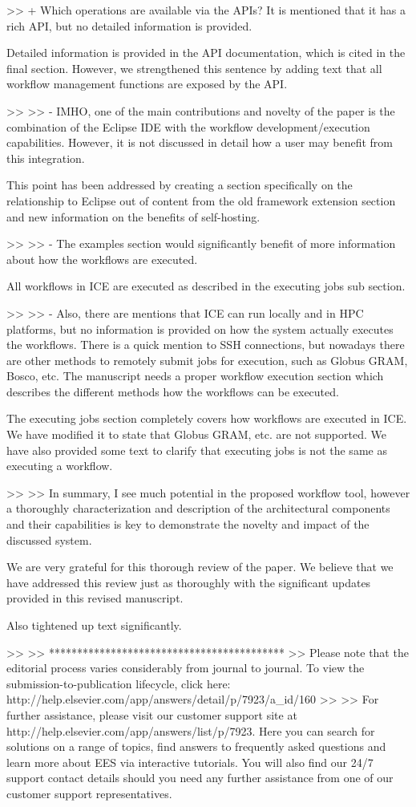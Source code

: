 >> + Which operations are available via the APIs? It is mentioned that it has a rich API, but no detailed information is provided.

Detailed information is provided in the API documentation, which is cited in the final section. However, we strengthened this sentence by adding text that all workflow management functions are exposed by the API.

>> 
>> - IMHO, one of the main contributions and novelty of the paper is the combination of the Eclipse IDE with the workflow development/execution capabilities. However, it is not discussed in detail how a user may benefit from this integration.

This point has been addressed by creating a section specifically on the relationship to Eclipse out of content from the old framework extension section and new information on the benefits of self-hosting.

>> 
>> - The examples section would significantly benefit of more information about how the workflows are executed.

All workflows in ICE are executed as described in the executing jobs sub section.

>> 
>> - Also, there are mentions that ICE can run locally and in HPC platforms, but no information is provided on how the system actually executes the workflows. There is a quick mention to SSH connections, but nowadays there are other methods to remotely submit jobs for execution, such as Globus GRAM, Bosco, etc. The manuscript needs a proper workflow execution section which describes the different methods how the workflows can be executed.

The executing jobs section completely covers how workflows are executed in ICE. We have modified it to state that Globus GRAM, etc. are not supported. We have also provided some text to clarify that executing jobs is not the same as executing a workflow.

>> 
>> In summary, I see much potential in the proposed workflow tool, however a thoroughly characterization and description of the architectural components and their capabilities is key to demonstrate the novelty and impact of the discussed system.

We are very grateful for this thorough review of the paper. We believe that we have addressed this review just as thoroughly with the significant updates provided in this revised manuscript.

Also tightened up text significantly.

>> 
>> ******************************************
>> Please note that the editorial process varies considerably from journal to journal. To view the submission-to-publication lifecycle, click here: http://help.elsevier.com/app/answers/detail/p/7923/a_id/160
>> 
>> For further assistance, please visit our customer support site at http://help.elsevier.com/app/answers/list/p/7923. Here you can search for solutions on a range of topics, find answers to frequently asked questions and learn more about EES via interactive tutorials. You will also find our 24/7 support contact details should you need any further assistance from one of our customer support representatives.
